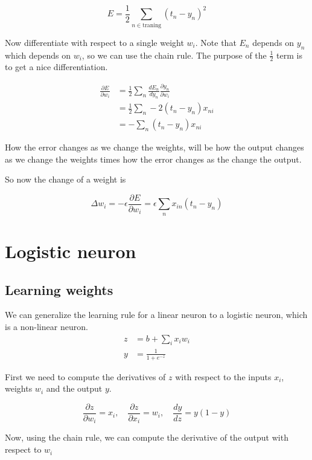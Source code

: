 \documentclass{article}
\begin{document}
\[
    E=\frac{1}{2} \sum_{n\in \text{traning}} {(t_n - y_n)}^2
\]

Now differentiate with respect to a single weight \(w_i\).
Note that \(E_n\) depends on \(y_n\) which depends on \(w_i\), so we can use the chain rule.
The purpose of the \(\frac{1}{2}\) term is to get a nice differentiation.

\begin{align*}
    \frac{\partial E}{\partial w_i}&=
    \frac{1}{2} \sum_n \frac{dE_n}{dy_n} \frac{\partial y_n}{\partial w_i} \\
    &= \frac{1}{2} \sum_n -2(t_n-y_n) x_{ni} \\
    &= - \sum_n (t_n-y_n) x_{ni}
\end{align*}

How the error changes as we change the weights, will be how the output changes as we change the weights
times how the error changes as the change the output.

So now the change of a weight is

\[
    \Delta w_i=-\epsilon \frac{\partial E}{\partial w_i} = \epsilon \sum_n x_{in}(t_n-y_n)
\]



\pagebreak

\section{Logistic neuron}

\subsection{Learning weights}

We can generalize the learning rule for a linear neuron to a logistic neuron, which is a non-linear neuron.
\\
\begin{align*}    
    z&=b+\sum_{i} x_i w_i \\
    y&=\frac{1}{1+e^{-z}}
\end{align*}

First we need to compute the derivatives of \(z\) with respect to the inputs \(x_i\), weights \(w_i\) and the output \(y\).

\[
    \frac{\partial z}{\partial w_i} = x_i,
    \quad
    \frac{\partial z}{\partial x_i} = w_i,
    \quad
    \frac{dy}{dz}=y(1-y)
\]

Now, using the chain rule, we can compute the derivative of the output with respect to \(w_i\)
\end{document}
